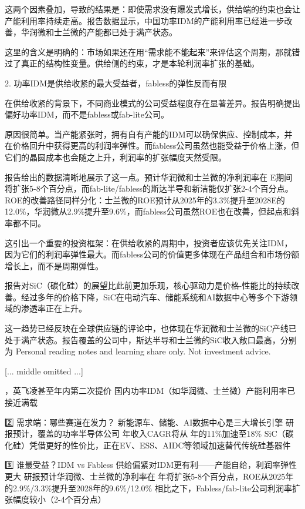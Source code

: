 \documentclass[11pt]{ctexart}
\begin{document}
这两个因素叠加，导致的结果是：即使需求没有爆发式增长，供给端的约束也会让产能利用率持续走高。报告数据显示，中国功率IDM的产能利用率已经进一步改善，华润微和士兰微的产能都已处于满产状态。

这里的含义是明确的：市场如果还在用“需求能不能起来”来评估这个周期，那就错过了真正的结构性变量。供给侧的约束，才是本轮利润率扩张的基础。

2. 功率IDM是供给收紧的最大受益者，fabless的弹性反而有限

在供给收紧的背景下，不同商业模式的公司受益程度存在显著差异。报告明确提出偏好功率IDM，而不是fabless或fab-lite公司。

原因很简单。当产能紧张时，拥有自有产能的IDM可以确保供应、控制成本，并在价格回升中获得更高的利润率弹性。而fabless公司虽然也能受益于价格上涨，但它们的晶圆成本也会随之上升，利润率的扩张幅度天然受限。

报告给出的数据清晰地展示了这一点。预计华润微和士兰微的净利润率在 E期间将扩张5-8个百分点，而fab-lite/fabless的斯达半导和新洁能仅扩张2-4个百分点。ROE的改善路径同样分化：士兰微的ROE预计从2025年的3.3\%提升至2028E的12.0\%，华润微从2.9\%提升至9.6\%，而fabless公司虽然ROE也在改善，但起点和斜率都不同。

这引出一个重要的投资框架：在供给收紧的周期中，投资者应该优先关注IDM，因为它们的利润率弹性最大。而fabless公司的价值更多体现在产品组合和市场份额增长上，而不是周期弹性。

报告对SiC（碳化硅）的展望比此前更加乐观，核心驱动力是价格-性能比的持续改善。经过多年的价格下降，SiC在电动汽车、储能系统和AI数据中心等多个下游领域的渗透率正在上升。

这一趋势已经反映在全球供应链的评论中，也体现在华润微和士兰微的SiC产线已处于满产状态。报告覆盖的公司中，斯达半导和士兰微的SiC收入敞口最高，分别为 Personal reading notes and learning share only. Not investment advice.


[... middle omitted ...]

，英飞凌甚至年内第二次提价 国内功率IDM（如华润微、士兰微）产能利用率已接近满载

2️⃣ 需求端：哪些赛道在发力？ 新能源车、储能、AI数据中心是三大增长引擎 研报预计，覆盖的功率半导体公司 年收入CAGR将从 年的11\%加速至18\% SiC（碳化硅）凭借更好的性价比，正在EV、ESS、AIDC等领域加速替代传统硅基器件

3️⃣ 谁最受益？IDM vs Fabless 供给偏紧对IDM更有利——产能自给，利润率弹性更大 研报预计华润微、士兰微的净利率在 年将扩张5-8个百分点，ROE从2025年的2.9\%/3.3\%提升至2028年的9.6\%/12.0\% 相比之下，Fabless/fab-lite公司利润率扩张幅度较小（2-4个百分点）
\end{document}
